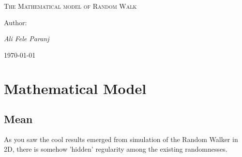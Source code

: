 \documentclass[12pt,a4paper]{article}
\begin{document}
\begin{titlepage}
\centering
\scshape\LARGE 
The Mathematical model of Random Walk

\vspace{1cm}
	
	\vspace{1.5cm}
	
	\vspace{2cm}
	\begin{Large}
	Author:
	\end{Large} \par
	{\Large\itshape Ali Fele Paranj \par}
	\vfill
	{\large \today\par}


\end{titlepage}

\newpage

\tableofcontents

\newpage

\section{Mathematical Model}
\subsection{Mean}
As you saw the cool results emerged from simulation of the Random Walker in 2D, there is somehow 'hidden' regularity among the existing randomnesses.
\end{document}

